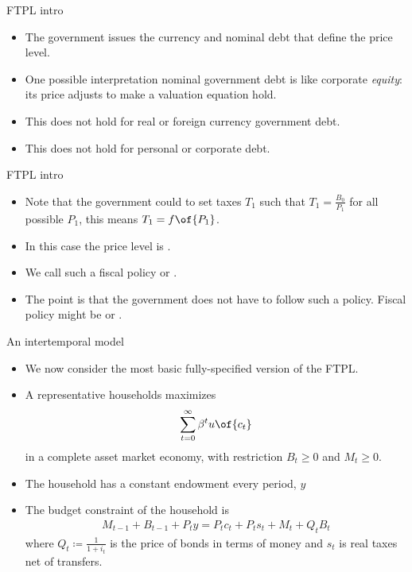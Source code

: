 \documentclass[11pt,xcolor={dvipsnames},aspectratio=159,hyperref={pdftex,pdfpagemode=UseNone,hidelinks,pdfdisplaydoctitle=true},usepdftitle=false]{beamer}
\begin{document}
\begin{frame}{FTPL intro}
    \begin{itemize}
            \item The government issues the currency and nominal debt that define the price level.
            \item One possible interpretation nominal government debt is like corporate \emph{equity}: its price adjusts to make a valuation equation hold.
            \item This does not hold for real or foreign currency government debt. 
            \item This does not hold for personal or corporate debt.
        \end{itemize}
    \end{frame}
\begin{frame}{FTPL intro}
    \begin{itemize}
            \item Note that the government could  to set taxes $T_1$ such that $T_1 = \frac{B_0}{P_1}$ for all possible $P_1$, this means $T_1 = f\of{P_1}$.
            \item In this case the price level is .
            \item We call such a fiscal policy  or .
            \item The point is that the government does not have to follow such a policy. Fiscal policy might be  or . 
        \end{itemize}
    \end{frame}

    \begin{frame}{An intertemporal model}
        \begin{itemize}
                \item We now consider the most basic fully-specified version of the FTPL.
                \item A representative households maximizes \begin{align*}
                    \sum_{t=0}^\infty \beta^t u\of{c_t}
                \end{align*}
                in a complete asset market economy, with restriction $B_t \geq 0$ and $M_t \geq 0$.
                \item The household has a constant endowment every period, $y$
                \item The budget constraint of the household is \begin{align*}
                    M_{t-1} + B_{t-1} + P_t y = P_t c_t + P_t s_t +  M_t + Q_t B_t \end{align*}
                    where $Q_t \coloneq \frac{1}{1+i_t}$ is the price of bonds in terms of money and $s_t$ is real taxes net of transfers. 
            \end{itemize}
        \end{frame}
\end{document}
